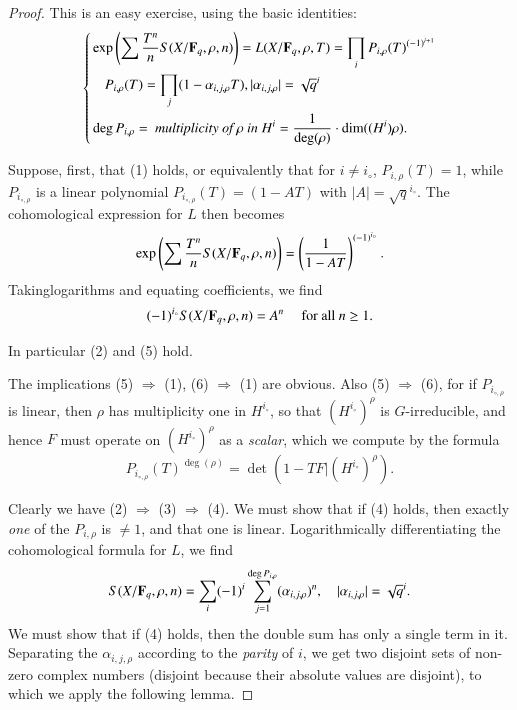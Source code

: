 \begin{proof}
This is an easy exercise, using the basic identities:
$$
\left\{
\begin{aligned}
&\exp \left(\sum \frac{T^n}{n}  S (X / \mathbf{F}_q, \rho, n)\right) = L (X/ \mathbf{F}_q, \rho, T) = \prod\limits_{i} P_{i,\rho} (T)^{(-1)^{i+1}}\\
& \quad P_{i,\rho} (T) = \prod\limits_j (1 - \alpha_{i,j,\rho} T), |\alpha_{i,j,\rho}| = \sqrt{q}^i\\
& \deg P_{i,\rho} = \textit{ multiplicity of $\rho$ in } H^i = \frac{1}{\deg (\rho)} \cdot \dim ((H^i)\rho).
\end{aligned}
\right.
$$

Suppose, first, that (1) holds, or equivalently that for $i \neq i_\circ$, $P_{i,\rho} (T) =1$, while $P_{i_{\circ, \rho}}$ is a linear polynomial $P_{i_{\circ,\rho}} (T) = (1-A T)$ with $|A| = \sqrt{q}^{i_\circ}$. The cohomological expression for $L$ then becomes 
$$
\exp \left(\sum \frac{T^n}{n} S (X/ \mathbf{F}_q, \rho, n) \right) = \left(\frac{1}{1-AT} \right)^{(-1)^{i_\circ}}.
$$
Taking\pageoriginale logarithms and equating coefficients, we find 
$$
(-1)^{i_\circ} S (X/ \mathbf{F}_q, \rho, n) = A^n \quad \text{ for all } n \geq 1. 
$$
 
In particular (2) and (5) hold.

The implications (5) $\Rightarrow$ (1), (6) $\Rightarrow$ (1) are obvious. Also (5) $\Rightarrow$ (6), for if $P_{i_{\circ, \rho}}$ is linear, then $\rho$ has multiplicity one in $H^{i_\circ}$, so that $(H^{i_\circ})^\rho$ is $G$-irreducible, and hence $F$ must operate on $(H^{i_\circ})^\rho$ as a \textit{scalar}, which we compute by the formula
$$
P_{i_{\circ, \rho}} (T)^{\deg (\rho)} = \det (1 - TF \big| (H^{i_\circ})^\rho).
$$

Clearly we have (2) $\Rightarrow$ (3) $\Rightarrow$ (4). We must show that if (4) holds, then exactly \textit{one} of the $P_{i,\rho}$ is $\neq 1$, and that one is linear. Logarithmically differentiating the cohomological formula for $L$, we find 
$$
S(X/ \mathbf{F}_q, \rho, n) = \sum\limits_i (-1)^i \sum\limits^{\deg P_{i, \rho}}_{j=1} (\alpha_{i, j, \rho})^n, \quad |\alpha_{i,j,\rho}| = \sqrt{q}^i.
$$
We must show that if (4) holds, then the double sum has only a single term in it. Separating the $\alpha_{i, j, \rho}$ according to the \textit{parity} of $i$, we get two disjoint sets of non-zero complex numbers (disjoint because their absolute values are disjoint), to which we apply the following lemma.
\end{proof}

